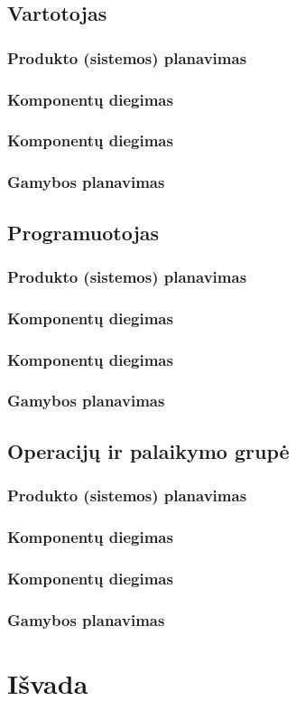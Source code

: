 \documentclass{VUMIFPSkursinis}
\begin{document}
\subsection{Vartotojas}
\subsubsection{Produkto (sistemos) planavimas}
\subsubsection{Komponentų diegimas}
\subsubsection{Komponentų diegimas}
\subsubsection{Gamybos planavimas}
\subsection{Programuotojas}
\subsubsection{Produkto (sistemos) planavimas}
\subsubsection{Komponentų diegimas}
\subsubsection{Komponentų diegimas}
\subsubsection{Gamybos planavimas}
\subsection{Operacijų ir palaikymo grupė}
\subsubsection{Produkto (sistemos) planavimas}
\subsubsection{Komponentų diegimas}
\subsubsection{Komponentų diegimas}
\subsubsection{Gamybos planavimas}

\section{Išvada}
\end{document}

